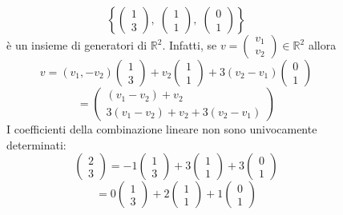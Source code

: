 \documentclass[a4paper]{article}
\theoremstyle{break}
\theoremstyle{break}
\theoremstyle{break}
\theoremstyle{break}
\begin{document}
  \begin{figure}[H]
    \begin{example}
      \[
        \left\{ \begin{pmatrix} 1\\3 \end{pmatrix},\;
          \begin{pmatrix} 1\\1 \end{pmatrix},\;
          \begin{pmatrix} 0\\1 \end{pmatrix} 
        \right\} 
      \] 
      è un insieme di generatori di \( \mathbb{R}^2 \).
      Infatti, se \( v = \begin{pmatrix} v_1\\v_2 \end{pmatrix} \in \mathbb{R}^2 \) allora
      \[
      v = (v_1,-v_2)\begin{pmatrix} 1\\3 \end{pmatrix} + v_2 \begin{pmatrix} 1\\1 \end{pmatrix} + 3(v_2-v_1)
      \begin{pmatrix} 0\\1 \end{pmatrix}
      \] 
      \[
      = \begin{pmatrix} 
        (v_1-v_2) + v_2\\
        3(v_1-v_2) + v_2 + 3(v_2-v_1)
      \end{pmatrix} 
      \] 
      I coefficienti della combinazione lineare non sono univocamente determinati:
      \[
      \begin{pmatrix} 2\\3 \end{pmatrix}  = -1 \begin{pmatrix} 1\\3 \end{pmatrix} 
      + 3 \begin{pmatrix} 1\\1 \end{pmatrix} + 3 \begin{pmatrix} 0\\1 \end{pmatrix} 
      \] 
      \[
      = 0 \begin{pmatrix} 1\\3 \end{pmatrix} + 2 \begin{pmatrix} 1\\1 \end{pmatrix} + 1 \begin{pmatrix} 0\\1 \end{pmatrix}
      \] 
    \end{example}
  \end{figure}
\end{document}
